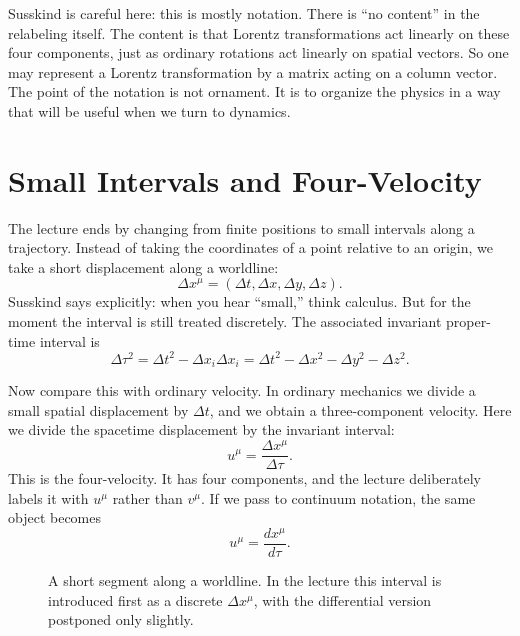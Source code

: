 Susskind is careful here: this is mostly notation. There is ``no content'' in the relabeling itself. The content is that Lorentz transformations act linearly on these four components, just as ordinary rotations act linearly on spatial vectors. So one may represent a Lorentz transformation by a matrix acting on a column vector. The point of the notation is not ornament. It is to organize the physics in a way that will be useful when we turn to dynamics.

\section{Small Intervals and Four-Velocity}

The lecture ends by changing from finite positions to small intervals along a trajectory. Instead of taking the coordinates of a point relative to an origin, we take a short displacement along a worldline:
\begin{equation}
\Delta x^\mu=(\Delta t,\Delta x,\Delta y,\Delta z).
\end{equation}
Susskind says explicitly: when you hear ``small,'' think calculus. But for the moment the interval is still treated discretely. The associated invariant proper-time interval is
\begin{equation}
\Delta\tau^2=\Delta t^2-\Delta x_i\Delta x_i
=\Delta t^2-\Delta x^2-\Delta y^2-\Delta z^2.
\end{equation}

Now compare this with ordinary velocity. In ordinary mechanics we divide a small spatial displacement by \(\Delta t\), and we obtain a three-component velocity. Here we divide the spacetime displacement by the invariant interval:
\begin{equation}
u^\mu=\frac{\Delta x^\mu}{\Delta\tau}.
\end{equation}
This is the four-velocity. It has four components, and the lecture deliberately labels it with \(u^\mu\) rather than \(v^\mu\). If we pass to continuum notation, the same object becomes
\begin{equation}
u^\mu=\frac{dx^\mu}{d\tau}.
\end{equation}

\begin{figure}[t]
\centering
{}
\caption{A short segment along a worldline. In the lecture this interval is introduced first as a discrete \(\Delta x^\mu\), with the differential version postponed only slightly.}
\end{figure}

